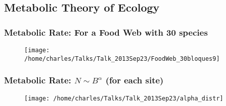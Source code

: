 \documentclass[xcolor=x11names,compress]{beamer}
\renewcommand{\(}{\begin{columns}}
\renewcommand{\)}{\end{columns}}
\newcommand{\<}[1]{\begin{column}{#1}}
\renewcommand{\>}{\end{column}}
\begin{document}

\subsection{Metabolic Theory of Ecology}

\begin{frame}
\frametitle{Metabolic Rate: For a Food Web with 30 species}
\begin{figure}
  \texttt{[image: /home/charles/Talks/Talk\_2013Sep23/FoodWeb\_30bloques9]}
\end{figure}
\end{frame}

\begin{frame}
\frametitle{Metabolic Rate: $N \sim B^{\alpha}$ (for each site)}
\begin{figure}
  \texttt{[image: /home/charles/Talks/Talk\_2013Sep23/alpha\_distr]}
\end{figure}
\end{frame}
\end{document}
